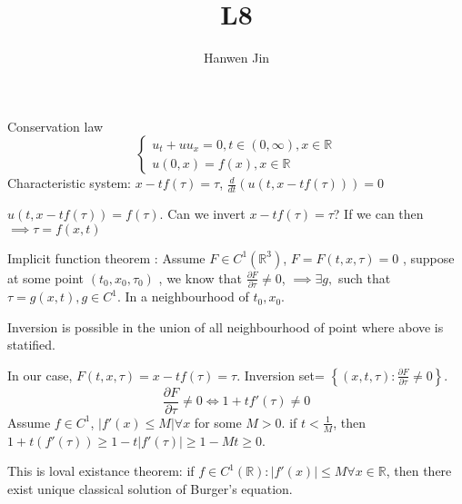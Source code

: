 \documentclass[a4paper]{article}
\title{L8}
\author{Hanwen Jin}
\theoremstyle{definition}
\begin{document}
	\maketitle
	Conservation law
	\begin{equation}
		\begin{cases}
			u_t+uu_x=0,t\in \left( 0,\infty \right) ,x\in \mathbb{R}\\
			u\left( 0,x \right) =f\left( x \right) ,x\in \mathbb{R}
		\end{cases}
	\end{equation} 	
	Characteristic system: $x-tf\left( \tau \right) =\tau$, $\frac{d}{dt}\left( u\left( t,x-tf\left( \tau \right)  \right)  \right) =0$

	$u\left( t,x-tf\left( \tau \right)  \right) =f\left( \tau \right) $. 
	Can we invert $x-tf\left( \tau \right) =\tau$? If we can then $\implies \tau =f\left( x,t \right) $

	Implicit function theorem : Assume $F\in C^{1}\left( \mathbb{R}^{3} \right) $, $F=F\left( t,x,\tau \right) =0$ , suppose at some point $\left( t_0,x_0,\tau_0 \right) $ , we know that $\frac{\partial F}{\partial \tau} \not =0$, $\implies \exists g, $ such that $\tau=g\left( x,t \right) , g\in C^{1}$. In a neighbourhood of $t_0,x_0$. 

	Inversion is possible in the union of all neighbourhood of point where above is statified. 

	In our case, $F\left( t,x,\tau \right) =x-tf\left( \tau \right) =\tau$. Inversion set= $\left\{ \left( x,t,\tau \right): \frac{\partial F}{\partial \tau} \not = 0  \right\} $. 
	\begin{equation}
		\frac{\partial F }{\partial \tau} \not = 0 \iff 1+tf'\left( \tau \right) \not = 0
	\end{equation} 
	Assume $f\in C^{1}$, $\left|f'\left( x \right) \le M  \right|\forall x $ for some $M>0$. if $t<\frac{1}{M}$, then $1+t\left( f'\left( \tau \right)  \right) \ge 1-t\left|f'\left( \tau \right)  \right|\ge 1-Mt \ge 0$. 

	This is loval existance theorem: if $f\in C^{1} \left( \mathbb{R} \right) :\left|f'\left( x \right)  \right| \le M \forall x\in \mathbb{R}$, then there exist unique classical solution of Burger's equation. 
\end{document}
